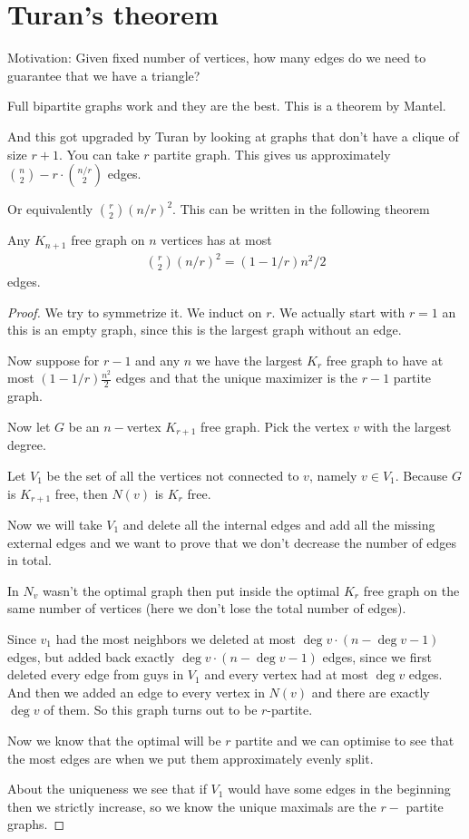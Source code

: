 \section{Turan's theorem}

Motivation: Given fixed number of vertices, how many edges do we need to guarantee that we have a triangle?

Full  bipartite graphs work and they are the best. This is a theorem by Mantel.

And this got upgraded by Turan by looking at graphs that don't have a clique of size $r+1$. You can take $r$ partite graph. This gives us approximately $\binom{n}{2} - r \cdot \binom{n/r}{2}$ edges.

Or equivalently $\binom{r}{2} (n/r)^2$. This can be written in the following theorem

\begin{izrek}[Turan]
    Any $K_{n+1}$ free graph on $n$ vertices has at most 
    \begin{align}
        \binom{r}{2} (n/r)^2 = (1-1/r) n^2/2
    \end{align}
    edges.
\end{izrek}

\begin{proof}
    We try to symmetrize it. We induct on $r$. We actually start with $r = 1$ an this is an empty graph, since this is the largest graph without an edge.

    Now suppose for $r-1$ and any $n$ we have the largest $K_r$ free graph to have at most $(1-1/r) \frac{n^2}2$ edges and that the unique maximizer is the $r-1$ partite graph.

    Now let $G$ be an $n-$vertex $K_{r+1}$ free graph. Pick the vertex $v$ with the largest degree.

    Let $V_1$ be the set of all the vertices not connected to $v$, namely $v\in V_1$. Because $G$ is $K_{r+1}$ free, then $N(v)$ is $K_r$ free.

    Now we will take $V_1$ and delete all the internal edges and add all the missing external edges and we want to prove that we don't decrease the number of edges in total.

    In $N_v$ wasn't the optimal graph then put inside the optimal $K_r$ free graph on the same number of vertices (here we don't lose the total number of edges).

    Since $v_1$ had the most neighbors we deleted at most $\deg v \cdot (n-\deg v-1)$ edges, but added back exactly $\deg v \cdot (n-\deg v -1)$ edges, since we first deleted every edge from guys in  $V_1$ and every vertex had at most $\deg v$ edges. And then we added an edge to every vertex in $N(v)$ and there are exactly $\deg v$ of them. So this graph turns out to be $r$-partite.

    Now we know that the optimal will be $r$ partite and we can optimise to see that the most edges are when we put them approximately evenly split.

    About the uniqueness we see that if $V_1$ would have some edges in the beginning then we strictly increase, so we know the unique maximals are the $r-$ partite graphs.
\end{proof}

